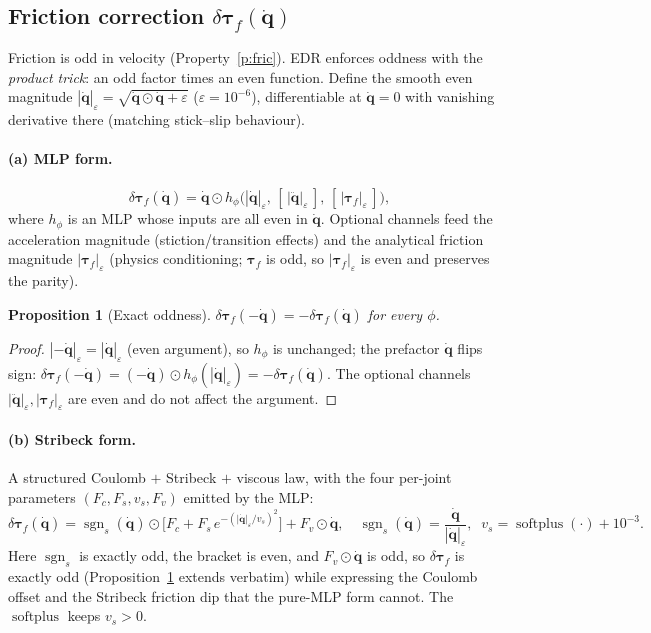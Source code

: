 \documentclass[11pt]{article}
\newcommand{\qd}{\dot{\bm{q}}}
\newcommand{\qdd}{\ddot{\bm{q}}}
\newcommand{\tf}{\bm{\tau}_f}
\newcommand{\dtf}{\delta\bm{\tau}_f}
\newcommand{\abs}[1]{\left\lvert #1 \right\rvert}
\DeclareMathOperator{\sgn}{sgn}
\DeclareMathOperator{\softplus}{softplus}
\theoremstyle{definition}
\theoremstyle{plain}
\newtheorem{proposition}{Proposition}
\begin{document}
\subsection{Friction correction \texorpdfstring{$\dtf(\qd)$}{dtau_f(qdot)}}
\label{sec:friction}
Friction is odd in velocity (Property~\ref{p:fric}). EDR enforces oddness with the
\emph{product trick}: an odd factor times an even function. Define the smooth even
magnitude $\abs{\qd}_\varepsilon=\sqrt{\qd\odot\qd+\varepsilon}$
($\varepsilon=10^{-6}$), differentiable at $\qd=0$ with vanishing derivative
there (matching stick--slip behaviour).

\paragraph{(a) MLP form.}
\begin{equation}
\dtf(\qd)=\qd\odot h_\phi\!\big(\abs{\qd}_\varepsilon,\,[\,\abs{\qdd}_\varepsilon\,],\,[\,\abs{\tf}_\varepsilon\,]\big),
\label{eq:fric-mlp}
\end{equation}
where $h_\phi$ is an MLP whose inputs are all even in $\qd$. Optional channels feed
the acceleration magnitude (stiction/transition effects) and the analytical
friction magnitude $\abs{\tf}_\varepsilon$ (physics conditioning; $\tf$ is odd, so
$\abs{\tf}_\varepsilon$ is even and preserves the parity).

\begin{proposition}[Exact oddness]\label{prop:odd}
$\dtf(-\qd)=-\dtf(\qd)$ for every $\phi$.
\end{proposition}
\begin{proof}
$\abs{-\qd}_\varepsilon=\abs{\qd}_\varepsilon$ (even argument), so
$h_\phi$ is unchanged; the prefactor $\qd$ flips sign:
$\dtf(-\qd)=(-\qd)\odot h_\phi(\abs{\qd}_\varepsilon)=-\dtf(\qd)$. The optional
channels $\abs{\qdd}_\varepsilon,\abs{\tf}_\varepsilon$ are even and do not affect
the argument.
\end{proof}

\paragraph{(b) Stribeck form.}
A structured Coulomb $+$ Stribeck $+$ viscous law, with the four per-joint
parameters $(F_c,F_s,v_s,F_v)$ emitted by the MLP:
\begin{equation}
\dtf(\qd)=\sgn_s(\qd)\odot\Big[F_c+F_s\,e^{-(\abs{\qd}_\varepsilon/v_s)^2}\Big]+F_v\odot\qd,
\quad
\sgn_s(\qd)=\frac{\qd}{\abs{\qd}_\varepsilon},\;\;
v_s=\softplus(\cdot)+10^{-3}.
\label{eq:fric-stribeck}
\end{equation}
Here $\sgn_s$ is exactly odd, the bracket is even, and $F_v\odot\qd$ is odd, so
$\dtf$ is exactly odd (Proposition~\ref{prop:odd} extends verbatim) while
expressing the Coulomb offset and the Stribeck friction dip that the pure-MLP form
cannot. The $\softplus$ keeps $v_s>0$.
\end{document}
